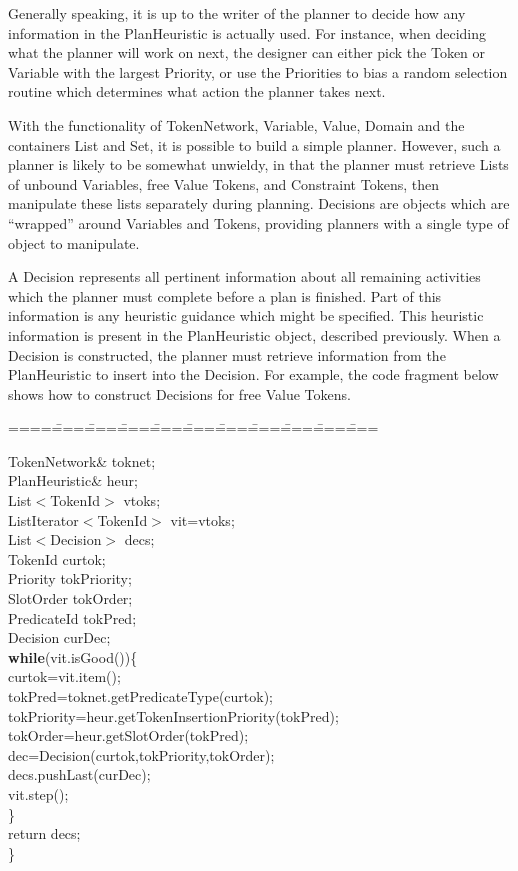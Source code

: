 Generally speaking, it is up to the writer of the planner to decide
how any information in the PlanHeuristic is actually used.
For instance, when deciding what the planner will work on next,
the designer can either pick the Token or Variable with the
largest Priority, or use the Priorities to bias a random selection
routine which determines what action the planner takes next.

With the functionality of TokenNetwork, Variable, Value, Domain
and the containers List and Set, it is possible to build a simple
planner.  However, such a planner is likely to be somewhat unwieldy,
in that the planner must retrieve Lists of unbound Variables, free
Value Tokens, and Constraint Tokens, then manipulate these
lists separately during planning.  Decisions are
objects which are ``wrapped'' around Variables and Tokens, providing
planners with a single type of object to manipulate.  

A Decision represents all pertinent information about all remaining
activities which the planner must complete before a plan is finished.
Part of this information is any heuristic guidance which might be
specified.  This heuristic information is present in the PlanHeuristic
object, described previously.  When a Decision is constructed, the
planner must retrieve information from the PlanHeuristic to insert
into the Decision.  For example, the code fragment below shows how
to construct Decisions for free Value Tokens.

\begin{tabbing}
====\====\====\====\====\====\====\====\====\====\====\kill

TokenNetwork\& toknet;\\
PlanHeuristic\& heur;\\
List$<$TokenId$>$ vtoks;\\
ListIterator$<$TokenId$>$ vit=vtoks;\\
List$<$Decision$>$ decs;\\
TokenId curtok;\\
Priority tokPriority;\\
SlotOrder tokOrder;\\
PredicateId tokPred;\\
Decision curDec;\\
{\bf while}(vit.isGood())\{\\
\>    curtok=vit.item();\\
\>    tokPred=toknet.getPredicateType(curtok);\\
\>    tokPriority=heur.getTokenInsertionPriority(tokPred);\\
\>    tokOrder=heur.getSlotOrder(tokPred);\\
\>    dec=Decision(curtok,tokPriority,tokOrder);\\
\>    decs.pushLast(curDec);    \\
\>    vit.step();\\
\>    \}\\
return decs;\\
\}
\end{tabbing}

